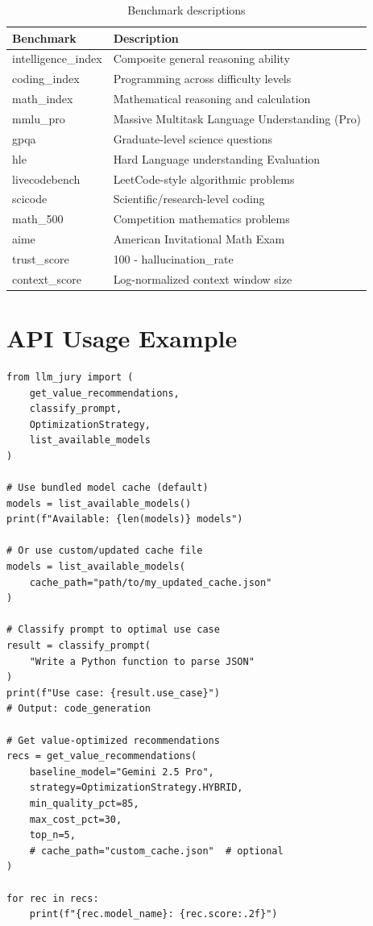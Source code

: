 \documentclass[11pt,a4paper]{article}
\begin{document}
\begin{table}[h]
\centering
\caption{Benchmark descriptions}
\label{tab:benchmarks}
\begin{tabular}{@{}lp{5cm}@{}}
\toprule
\textbf{Benchmark} & \textbf{Description} \\
\midrule
intelligence\_index & Composite general reasoning ability \\
coding\_index & Programming across difficulty levels \\
math\_index & Mathematical reasoning and calculation \\
mmlu\_pro & Massive Multitask Language Understanding (Pro) \\
gpqa & Graduate-level science questions \\
hle & Hard Language understanding Evaluation \\
livecodebench & LeetCode-style algorithmic problems \\
scicode & Scientific/research-level coding \\
math\_500 & Competition mathematics problems \\
aime & American Invitational Math Exam \\
trust\_score & 100 - hallucination\_rate \\
context\_score & Log-normalized context window size \\
\bottomrule
\end{tabular}
\end{table}

\section{API Usage Example}

\begin{verbatim}
from llm_jury import (
    get_value_recommendations,
    classify_prompt,
    OptimizationStrategy,
    list_available_models
)

# Use bundled model cache (default)
models = list_available_models()
print(f"Available: {len(models)} models")

# Or use custom/updated cache file
models = list_available_models(
    cache_path="path/to/my_updated_cache.json"
)

# Classify prompt to optimal use case
result = classify_prompt(
    "Write a Python function to parse JSON"
)
print(f"Use case: {result.use_case}")  
# Output: code_generation

# Get value-optimized recommendations
recs = get_value_recommendations(
    baseline_model="Gemini 2.5 Pro",
    strategy=OptimizationStrategy.HYBRID,
    min_quality_pct=85,
    max_cost_pct=30,
    top_n=5,
    # cache_path="custom_cache.json"  # optional
)

for rec in recs:
    print(f"{rec.model_name}: {rec.score:.2f}")
\end{verbatim}
\end{document}
